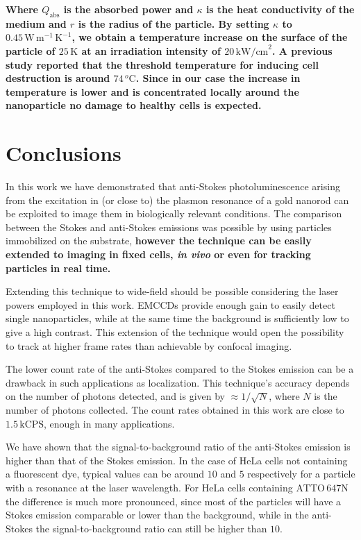 \documentclass[journal=nalefd,manuscript=letter]{achemso}
\newcommand{\pwr}{\ensuremath{\,\textrm{kW/cm}^2}}
\newcommand{\kCPS}{\ensuremath{\,\textrm{kCPS}}}
\newcommand{\atto}{\ensuremath{\textrm{ATTO}\,647\textrm{N}}}
\newcommand{\Watt}{\ensuremath{\,\textrm{W}}}
\newcommand{\meter}{\ensuremath{\,\textrm{m}}}
\newcommand{\K}{\ensuremath{\,\textrm{K}}}
\newcommand{\degree}{\ensuremath{\,^o\textrm{C}}}
\begin{document}
\textbf{Where $Q_\textrm{abs}$ is the absorbed power and $\kappa$ is the heat
conductivity of the medium and $r$ is the radius of the particle. By setting
$\kappa$ to $0.45\Watt\meter^{-1}\K^{-1}$\cite{Sturesson1995}, we obtain a temperature
increase on the surface of the particle of $25\K$ at an irradiation intensity of
$20\pwr$. A previous study\cite{Huang2006a} reported that the threshold
temperature for inducing cell destruction is around $74\degree$. Since in our
case the increase in temperature is lower and is concentrated locally around the
nanoparticle no damage to healthy cells is expected.}

\section{Conclusions}
In this work we have demonstrated that anti-Stokes photoluminescence arising
from the excitation in (or close to) the plasmon resonance of a gold nanorod can
be exploited to image them in biologically relevant conditions\cite{Jiang2013}.
The comparison between the Stokes and anti-Stokes emissions was possible by
using particles immobilized on the substrate, \textbf{however the technique can
be easily extended to imaging in fixed cells, \textit{in vivo} or even for
tracking particles in real time\cite{VandenBroek2013}.}

Extending this technique to wide-field should be possible considering the laser
powers employed in this work. EMCCDs provide enough gain\cite{Dussault2004} to
easily detect single nanoparticles, while at the same time the background is
sufficiently low to give a high contrast. This extension of the technique would
open the possibility to track at higher frame rates than achievable by
confocal imaging.

The lower count rate of the anti-Stokes compared to the Stokes emission can be a
drawback in such applications as localization\cite{Sahl2013}. This technique's
accuracy depends on the number of photons detected, and is given by $\approx
1/\sqrt{N}$, where $N$ is the number of photons collected. The count rates
obtained in this work are close to $1.5\kCPS$, enough in many applications.

We have shown that the signal-to-background ratio of the anti-Stokes emission is
higher than that of the Stokes emission. In the case of HeLa cells not containing a
fluorescent dye, typical values can be around $10$ and $5$ respectively for a
particle with a resonance at the laser wavelength. For HeLa cells containing
$\atto$ the difference is much more pronounced, since most of the particles will
have a Stokes emission comparable or lower than the background, while in the anti-Stokes the
signal-to-background ratio can still be higher than $10$.
\end{document}
